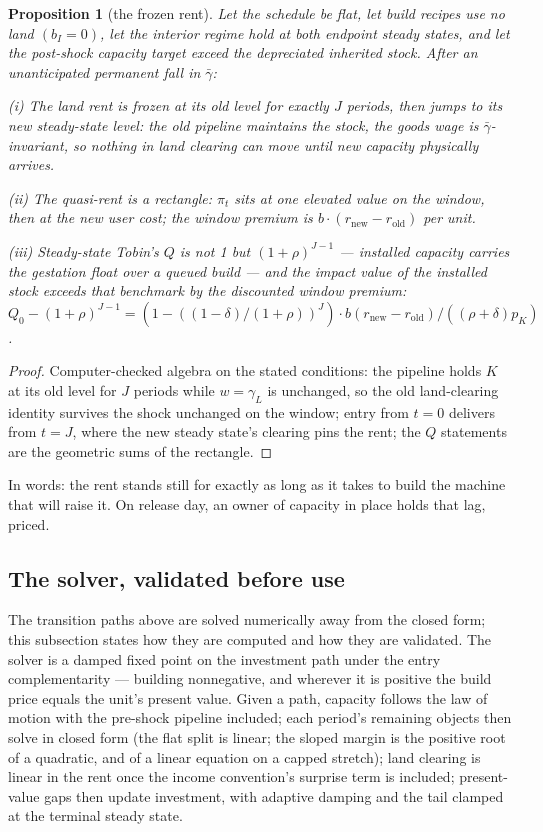 \documentclass[12pt]{article}
\theoremstyle{plain}
\newtheorem{proposition}{Proposition}
\begin{document}
\begin{proposition}[the frozen rent]\label{prop:frozen-rent}
Let the schedule be flat, let build recipes use no land $(b_I = 0)$, let the interior regime hold at both endpoint steady states, and let the post-shock capacity target exceed the depreciated inherited stock. After an unanticipated permanent fall in $\bar{\gamma}$:

(i) The land rent is frozen at its old level for exactly $J$ periods, then jumps to its new steady-state level: the old pipeline maintains the stock, the goods wage is $\bar{\gamma}$-invariant, so nothing in land clearing can move until new capacity physically arrives.

(ii) The quasi-rent is a rectangle: $\pi _t$ sits at one elevated value on the window, then at the new user cost; the window premium is $b\cdot (r_{\mathrm{new}} - r_{\mathrm{old}})$ per unit.

(iii) Steady-state Tobin's $Q$ is not 1 but $(1+\rho )^{J-1}$ --- installed capacity carries the gestation float over a queued build --- and the impact value of the installed stock exceeds that benchmark by the discounted window premium: $Q_0 - (1+\rho )^{J-1} = (1 - ((1-\delta )/(1+\rho ))^J)\cdot b(r_{\mathrm{new}} - r_{\mathrm{old}})/((\rho +\delta )p_K)$.
\end{proposition}

\begin{proof}
Computer-checked algebra on the stated conditions: the pipeline holds $K$ at its old level for $J$ periods while $w = \gamma _L$ is unchanged, so the old land-clearing identity survives the shock unchanged on the window; entry from $t = 0$ delivers from $t = J$, where the new steady state's clearing pins the rent; the $Q$ statements are the geometric sums of the rectangle.
\end{proof}

In words: the rent stands still for exactly as long as it takes to build the machine that will raise it. On release day, an owner of capacity in place holds that lag, priced.

\subsection{The solver, validated before use}\label{sec:solver-validated}

The transition paths above are solved numerically away from the closed form; this subsection states how they are computed and how they are validated. The solver is a damped fixed point on the investment path under the entry complementarity --- building nonnegative, and wherever it is positive the build price equals the unit's present value. Given a path, capacity follows the law of motion with the pre-shock pipeline included; each period's remaining objects then solve in closed form (the flat split is linear; the sloped margin is the positive root of a quadratic, and of a linear equation on a capped stretch); land clearing is linear in the rent once the income convention's surprise term is included; present-value gaps then update investment, with adaptive damping and the tail clamped at the terminal steady state.
\end{document}
